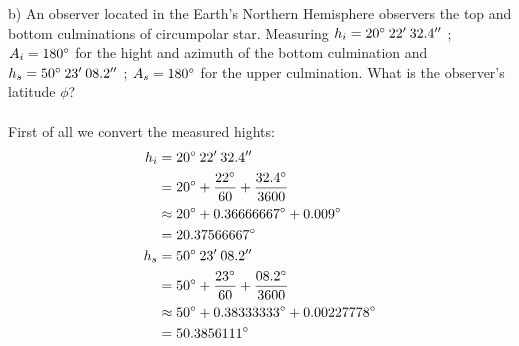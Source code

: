 \noindent{}
\noindent
b) An observer located in the Earth's Northern Hemisphere observers the top and bottom culminations of
circumpolar star. Measuring $h_i = 20 \degree \: 22' \: 32.4''$ ; $A_i = 180 \degree$ for the hight and
azimuth of the bottom culmination and $h_s = 50 \degree \: 23' \: 08.2''$ ; $A_s = 180 \degree$ for the
upper culmination. What is the observer's latitude $\phi$?\\
\\
First of all we convert the measured hights:
\begin{equation*}
    \begin{split}
        h_i &= 20 \degree \: 22' \: 32.4''\\
            &= 20 \degree + \frac{22 \degree}{60} + \frac{32.4 \degree}{3600}\\
            &\approx 20 \degree + 0.36666667 \degree + 0.009 \degree\\
            &= 20.37566667 \degree\\
        h_s &= 50 \degree \: 23' \: 08.2''\\
            &= 50 \degree + \frac{23 \degree}{60} + \frac{08.2 \degree}{3600}\\
            &\approx 50 \degree + 0.38333333 \degree + 0.00227778\degree\\
            &= 50.3856111 \degree\\
    \end{split}
\end{equation*}
